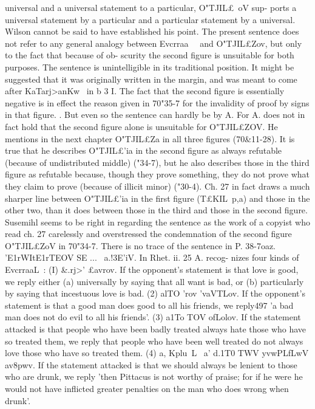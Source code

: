 {{{{{{{{{{{{{{{{{{{{{{{{{{{{{universal and a universal statement to a particular, O"TJIL£~oV sup-
ports a universal statement by a particular and a particular
statement by a universal.
Wilson cannot be said to have established his point. The
present sentence does not refer to any general analogy between
Evcrraa~~ and O"TJIL£Zov, but only to the fact that because of ob-
scurity the second figure is unsuitable for both purposes.
The sentence is unintelligible in its traditional position. It
might be suggested that it was originally written in the margin,
and was meant to come after KaTarj>anKw~ in b 3 I. The fact that
the second figure is essentially negative is in effect the reason
given in 70"35-7 for the invalidity of proof by signs in that figure.
. But even so the sentence can hardly be by A. For A. does not
in fact hold that the second figure alone is unsuitable for O"TJIL£ZOV.
He mentions in the next chapter O"TJIL£Za in all three figures
(70&11-28). It is true that he describes O"TJIL£'ia in the second figure
as always refutable (because of undistributed middle) ("34-7), but
he also describes those in the third figure as refutable because,
though they prove something, they do not prove what they claim
to prove (because of illicit minor) ("30-4). Ch. 27 in fact draws a
much sharper line between O"TJIL£'ia in the first figure (T£KIL~p,a)
and those in the other two, than it does between those in the
third and those in the second figure. Susemihl seems to be right
in regarding the sentence as the work of a copyist who read
ch. 27 carelessly and overstressed the condemnation of the second
figure O"TJIL£ZoV in 70"34-7. There is no trace of the sentence in P.
38-7oaz. 'E1rWItE1rTEOV SE ... ~a.!3E'iV. In Rhet. ii. 25 A. recog-
nizes four kinds of EvcrraaL~: (I) &.rj>' £avrov. If the opponent's
statement is that love is good, we reply either (a) universally by
saying that all want is bad, or (b) particularly by saying that
incestuous love is bad. (2) alTO 'rov 'vaVTLov. If the opponent's
statement is that a good man does good to all his friends, we reply497
'a bad man does not do evil to all his friends'. (3) a1To TOV ofLolov. If
the statement attacked is that people who have been badly
treated always hate those who have so treated them, we reply
that people who have been well treated do not always love those
who have so treated them. (4) a, Kplu~L~ a' d.1T0 TWV yvwPLfLwV av8pwv.
If the statement attacked is that we should always be lenient
to those who are drunk, we reply 'then Pittacus is not worthy
of praise; for if he were he would not have inflicted greater
penalties on the man who does wrong when drunk'.
}}}}}}}}}}}}}}}}}}}}}}}}}}}}}
